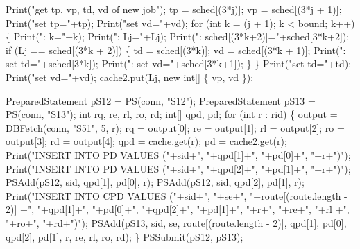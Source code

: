 \documentclass{article}
\def\nwendcode{\endtrivlist \endgroup}      %
\let\nwdocspar=\par
\theoremstyle{definition}                   %
\begin{document}
Print("get tp, vp, td, vd of new job");
tp = sched[(3*j)];
vp = sched[(3*j + 1)];
Print("set tp="+tp);
Print("set vd="+vd);
for (int k = (j + 1); k < bound; k++) \{
  Print(": k="+k);
  Print(":   Lj="+Lj);
  Print(":   sched[(3*k+2)]="+sched[3*k+2]);
  if (Lj == sched[(3*k + 2)]) \{
    td = sched[(3*k)];
    vd = sched[(3*k + 1)];
    Print(":   set td="+sched[3*k]);
    Print(":   set vd="+sched[3*k+1]);
  \}
\}
Print("set td="+td);
Print("set vd="+vd);
cache2.put(Lj, new int[] \{ vp, vd \});
\nwendcode{}\nwdocspar
\nwenddocs{}\endmoddef{}
PreparedStatement pS12 = PS(conn, "S12");
PreparedStatement pS13 = PS(conn, "S13");
int rq, re, rl, ro, rd;
int[] qpd, pd;
for (int r : rid) \{
  output = DBFetch(conn, "S51", 5, r);
  rq = output[0];
  re = output[1];
  rl = output[2];
  ro = output[3];
  rd = output[4];
  qpd = cache.get(r);
  pd = cache2.get(r);
  Print("INSERT INTO PD VALUES ("+sid+", "+qpd[1]+", "+pd[0]+", "+r+")");
  Print("INSERT INTO PD VALUES ("+sid+", "+qpd[2]+", "+pd[1]+", "+r+")");
  PSAdd(pS12, sid, qpd[1], pd[0], r);
  PSAdd(pS12, sid, qpd[2], pd[1], r);
  Print("INSERT INTO CPD VALUES ("+sid+", "+se+", "+route[(route.length - 2)]
    +", "+qpd[1]+", "+pd[0]+", "+qpd[2]+", "+pd[1]+", "+r+", "+re+", "+rl
    +", "+ro+", "+rd+")");
  PSAdd(pS13, sid, se, route[(route.length - 2)], qpd[1], pd[0], qpd[2], pd[1],
        r, re, rl, ro, rd);
\}
PSSubmit(pS12, pS13);
\nwendcode{}\nwdocspar
\end{document}
